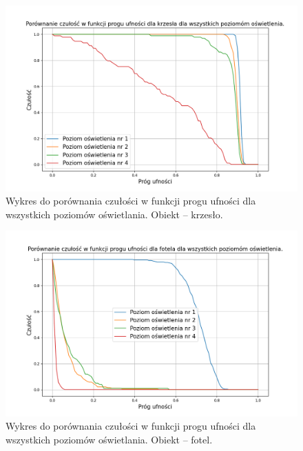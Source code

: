 \begin{figure}[H]
    \centering
    \includegraphics[width=\linewidth]{r_test_dokładności/chair_charts/chair.png}
    \caption{Wykres do porównania czułości w funkcji progu ufności dla wszystkich poziomów oświetlania. Obiekt --  krzesło.}
    \label{fig:all_bright_chair}
\end{figure}

\begin{figure}[H]
    \centering
    \includegraphics[width=\linewidth]{r_test_dokładności/chair_charts/gaming-chair.png}
    \caption{Wykres do porównania czułości w funkcji progu ufności dla wszystkich poziomów oświetlania. Obiekt --  fotel.}
    \label{fig:all_bright_game}
\end{figure}